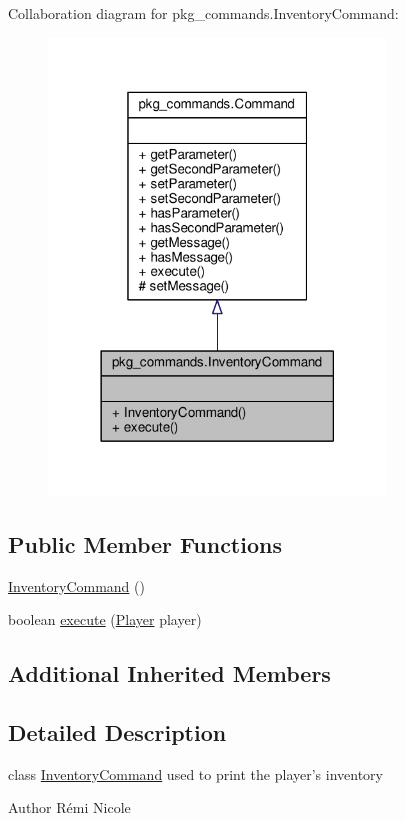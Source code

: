 Collaboration diagram for pkg\-\_\-commands.\-Inventory\-Command\-:
\nopagebreak
\begin{figure}[H]
\begin{center}
\leavevmode
\includegraphics[width=254pt]{classpkg__commands_1_1InventoryCommand__coll__graph}
\end{center}
\end{figure}
\subsection*{Public Member Functions}
\begin{DoxyCompactItemize}
\item 
\hyperlink{classpkg__commands_1_1InventoryCommand_a4ca959fe6979e5ca2a79a0596803533d}{Inventory\-Command} ()
\item 
boolean \hyperlink{classpkg__commands_1_1InventoryCommand_a16ce9e3db461ecb7c4a50d2bdef65022}{execute} (\hyperlink{classpkg__world_1_1Player}{Player} player)
\end{DoxyCompactItemize}
\subsection*{Additional Inherited Members}


\subsection{Detailed Description}
class \hyperlink{classpkg__commands_1_1InventoryCommand}{Inventory\-Command} used to print the player's inventory \begin{DoxyAuthor}{Author}
Rémi Nicole 
\end{DoxyAuthor}


